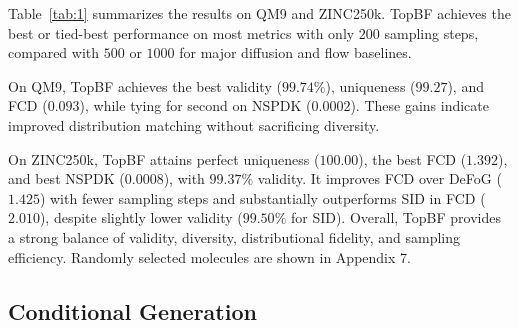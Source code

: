 \documentclass[journal,twoside,web]{ieeecolor}
\begin{document}
Table~\ref{tab:1} summarizes the results on QM9 and ZINC250k. TopBF achieves the best or tied-best performance on most metrics with only $200$ sampling steps, compared with $500$ or $1000$ for major diffusion and flow baselines.

On QM9, TopBF achieves the best validity ($99.74\%$), uniqueness ($99.27$), and FCD ($0.093$), while tying for second on NSPDK ($0.0002$). These gains indicate improved distribution matching without sacrificing diversity.

On ZINC250k, TopBF attains perfect uniqueness ($100.00$), the best FCD ($1.392$), and best NSPDK ($0.0008$), with $99.37\%$ validity. It improves FCD over DeFoG ($1.425$) with fewer sampling steps and substantially outperforms SID in FCD ($2.010$), despite slightly lower validity ($99.50\%$ for SID). Overall, TopBF provides a strong balance of validity, diversity, distributional fidelity, and sampling efficiency. Randomly selected molecules are shown in Appendix 7.



\subsection{Conditional Generation}

\end{document}
